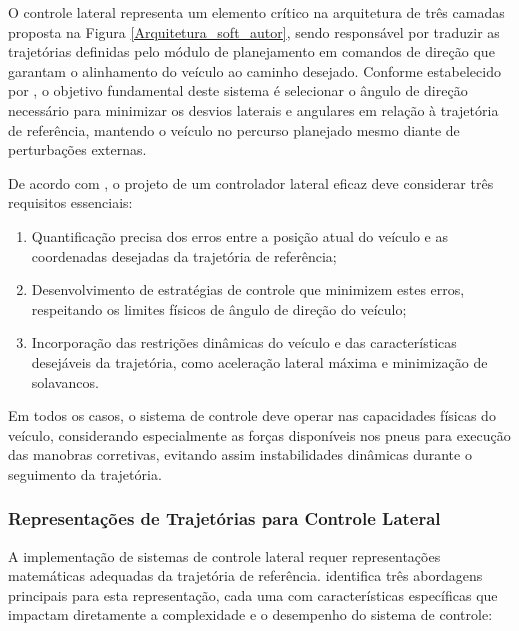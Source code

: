 O controle lateral representa um elemento crítico na arquitetura de três camadas proposta na Figura \ref{Arquitetura_soft_autor}, sendo responsável por traduzir as trajetórias definidas pelo módulo de planejamento em comandos de direção que garantam o alinhamento do veículo ao caminho desejado. Conforme estabelecido por , o objetivo fundamental deste sistema é selecionar o ângulo de direção necessário para minimizar os desvios laterais e angulares em relação à trajetória de referência, mantendo o veículo no percurso planejado mesmo diante de perturbações externas.

De acordo com , o projeto de um controlador lateral eficaz deve considerar três requisitos essenciais:

\begin{enumerate}
    \item Quantificação precisa dos erros entre a posição atual do veículo e as coordenadas desejadas da trajetória de referência;
    \item Desenvolvimento de estratégias de controle que minimizem estes erros, respeitando os limites físicos de ângulo de direção do veículo;
    \item Incorporação das restrições dinâmicas do veículo e das características desejáveis da trajetória, como aceleração lateral máxima e minimização de solavancos.
\end{enumerate}

Em todos os casos, o sistema de controle deve operar nas capacidades físicas do veículo, considerando especialmente as forças disponíveis nos pneus para execução das manobras corretivas, evitando assim instabilidades dinâmicas durante o seguimento da trajetória.

\subsubsection*{Representações de Trajetórias para Controle Lateral} \label{subsubsec:representacao-trajetorias}

A implementação de sistemas de controle lateral requer representações matemáticas adequadas da trajetória de referência.  identifica três abordagens principais para esta representação, cada uma com características específicas que impactam diretamente a complexidade e o desempenho do sistema de controle:

